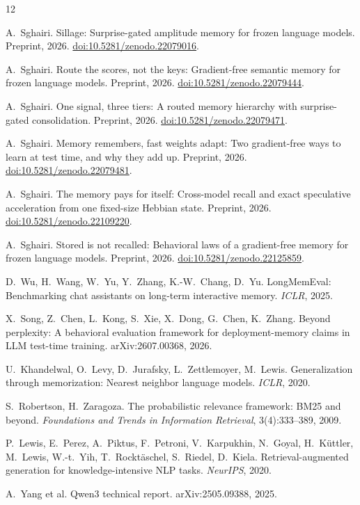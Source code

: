 \documentclass[11pt]{article}
\begin{document}
\begin{thebibliography}{12}\small

 A.~Sghairi. Sillage: Surprise-gated amplitude memory for frozen language models. Preprint, 2026. \href{https://doi.org/10.5281/zenodo.22079016}{doi:10.5281/zenodo.22079016}.

 A.~Sghairi. Route the scores, not the keys: Gradient-free semantic memory for frozen language models. Preprint, 2026. \href{https://doi.org/10.5281/zenodo.22079444}{doi:10.5281/zenodo.22079444}.

 A.~Sghairi. One signal, three tiers: A routed memory hierarchy with surprise-gated consolidation. Preprint, 2026. \href{https://doi.org/10.5281/zenodo.22079471}{doi:10.5281/zenodo.22079471}.

 A.~Sghairi. Memory remembers, fast weights adapt: Two gradient-free ways to learn at test time, and why they add up. Preprint, 2026. \href{https://doi.org/10.5281/zenodo.22079481}{doi:10.5281/zenodo.22079481}.

 A.~Sghairi. The memory pays for itself: Cross-model recall and exact speculative acceleration from one fixed-size Hebbian state. Preprint, 2026. \href{https://doi.org/10.5281/zenodo.22109220}{doi:10.5281/zenodo.22109220}.

 A.~Sghairi. Stored is not recalled: Behavioral laws of a gradient-free memory for frozen language models. Preprint, 2026. \href{https://doi.org/10.5281/zenodo.22125859}{doi:10.5281/zenodo.22125859}.

 D.~Wu, H.~Wang, W.~Yu, Y.~Zhang, K.-W.~Chang, D.~Yu. LongMemEval: Benchmarking chat assistants on long-term interactive memory. \emph{ICLR}, 2025.

 X.~Song, Z.~Chen, L.~Kong, S.~Xie, X.~Dong, G.~Chen, K.~Zhang. Beyond perplexity: A behavioral evaluation framework for deployment-memory claims in LLM test-time training. arXiv:2607.00368, 2026.

 U.~Khandelwal, O.~Levy, D.~Jurafsky, L.~Zettlemoyer, M.~Lewis. Generalization through memorization: Nearest neighbor language models. \emph{ICLR}, 2020.

 S.~Robertson, H.~Zaragoza. The probabilistic relevance framework: BM25 and beyond. \emph{Foundations and Trends in Information Retrieval}, 3(4):333--389, 2009.

 P.~Lewis, E.~Perez, A.~Piktus, F.~Petroni, V.~Karpukhin, N.~Goyal, H.~K\"uttler, M.~Lewis, W.-t.~Yih, T.~Rockt\"aschel, S.~Riedel, D.~Kiela. Retrieval-augmented generation for knowledge-intensive NLP tasks. \emph{NeurIPS}, 2020.

 A.~Yang et al. Qwen3 technical report. arXiv:2505.09388, 2025.

\end{thebibliography}
\end{document}
